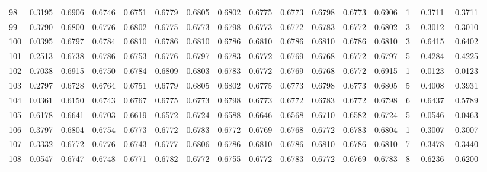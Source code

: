 \begin{tabular}{lrrrrrrrrrrrrrrr}
98  &      0.3195 &  0.6906 &  0.6746 &  0.6751 &  0.6779 &  0.6805 &  0.6802 &  0.6775 &  0.6773 &  0.6798 &   0.6773 &     0.6906 &      1 &                    0.3711 &                     0.3711 \\
99  &      0.3790 &  0.6800 &  0.6776 &  0.6802 &  0.6775 &  0.6773 &  0.6798 &  0.6773 &  0.6772 &  0.6783 &   0.6772 &     0.6802 &      3 &                    0.3012 &                     0.3010 \\
100 &      0.0395 &  0.6797 &  0.6784 &  0.6810 &  0.6786 &  0.6810 &  0.6786 &  0.6810 &  0.6786 &  0.6810 &   0.6786 &     0.6810 &      3 &                    0.6415 &                     0.6402 \\
101 &      0.2513 &  0.6738 &  0.6786 &  0.6753 &  0.6776 &  0.6797 &  0.6783 &  0.6772 &  0.6769 &  0.6768 &   0.6772 &     0.6797 &      5 &                    0.4284 &                     0.4225 \\
102 &      0.7038 &  0.6915 &  0.6750 &  0.6784 &  0.6809 &  0.6803 &  0.6783 &  0.6772 &  0.6769 &  0.6768 &   0.6772 &     0.6915 &      1 &                   -0.0123 &                    -0.0123 \\
103 &      0.2797 &  0.6728 &  0.6764 &  0.6751 &  0.6779 &  0.6805 &  0.6802 &  0.6775 &  0.6773 &  0.6798 &   0.6773 &     0.6805 &      5 &                    0.4008 &                     0.3931 \\
104 &      0.0361 &  0.6150 &  0.6743 &  0.6767 &  0.6775 &  0.6773 &  0.6798 &  0.6773 &  0.6772 &  0.6783 &   0.6772 &     0.6798 &      6 &                    0.6437 &                     0.5789 \\
105 &      0.6178 &  0.6641 &  0.6703 &  0.6619 &  0.6572 &  0.6724 &  0.6588 &  0.6646 &  0.6568 &  0.6710 &   0.6582 &     0.6724 &      5 &                    0.0546 &                     0.0463 \\
106 &      0.3797 &  0.6804 &  0.6754 &  0.6773 &  0.6772 &  0.6783 &  0.6772 &  0.6769 &  0.6768 &  0.6772 &   0.6783 &     0.6804 &      1 &                    0.3007 &                     0.3007 \\
107 &      0.3332 &  0.6772 &  0.6776 &  0.6743 &  0.6777 &  0.6806 &  0.6786 &  0.6810 &  0.6786 &  0.6810 &   0.6786 &     0.6810 &      7 &                    0.3478 &                     0.3440 \\
108 &      0.0547 &  0.6747 &  0.6748 &  0.6771 &  0.6782 &  0.6772 &  0.6755 &  0.6772 &  0.6783 &  0.6772 &   0.6769 &     0.6783 &      8 &                    0.6236 &                     0.6200 \\

\end{tabular}

